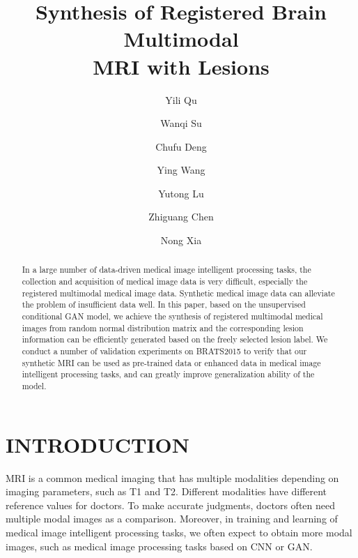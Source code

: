 \documentclass{ecai}
\begin{document}
\title{Synthesis of Registered Brain Multimodal\\
	MRI with Lesions}

\author{ Yili Qu  \and Wanqi Su \and Chufu Deng \and Ying Wang \\
	\and Yutong Lu \and Zhiguang Chen \and Nong Xia }

\maketitle


\begin{abstract}
  In a large number of data-driven medical image intelligent processing tasks, the collection and acquisition of medical image data is very difficult, especially the registered multimodal medical image data. Synthetic medical image data can alleviate the problem of insufficient data well. In this paper, based on the unsupervised conditional GAN model, we achieve the synthesis of registered multimodal medical images from random normal distribution matrix and the corresponding lesion information can be efficiently generated based on the freely selected lesion label. We conduct a number of validation experiments on BRATS2015 to verify that our synthetic MRI can be used as pre-trained data or enhanced data in medical image intelligent processing tasks, and can greatly improve generalization ability of the model.
\end{abstract}

\section{INTRODUCTION}
%

MRI is a common medical imaging that has multiple modalities depending on imaging parameters, such as T1 and T2. Different modalities have different reference values for doctors. To make accurate judgments, doctors often need multiple modal images as a comparison. Moreover, in training and learning of medical image intelligent processing tasks, we often expect to obtain more modal images, such as medical image processing tasks based on CNN\cite{86krizhevsky2012imagenet} or GAN\cite{25goodfellow2014generative}. 
\end{document}
